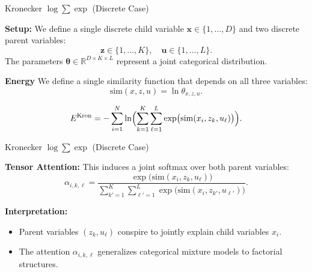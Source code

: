 \documentclass{beamer}
\begin{document}

\begin{frame}{Kronecker $\log \sum \exp$ (Discrete Case)}

    \textbf{Setup:}  
    We define a single discrete child variable \(\bm{x} \in \{1, \dots, D\}\) and two discrete parent variables:
    \[
    \bm{z} \in \{1, \dots, K\}, 
    \quad 
    \bm{u} \in \{1, \dots, L\}.
    \]
    The parameters \(\bm{\theta} \in \mathbb{R}^{D \times K \times L}\) represent a joint categorical distribution.
        
    \textbf{Energy}  
    We define a single similarity function that depends on all three variables:
    \[
    \mathrm{sim}(x, z, u)
    =
    \ln \theta_{x, z, u}.
    \]
    
    \[
        E^{\mathrm{Kron}}
        =
        - \sum_{i=1}^{N}
        \ln \Bigl(
        \sum_{k=1}^{K} \sum_{\ell=1}^{L}
        \exp\bigl(\mathrm{sim}(x_i, z_k, u_\ell)\bigr)
        \Bigr).
        \]
    \end{frame}
    
    
\begin{frame}{Kronecker $\log \sum \exp$ (Discrete Case)}


    \textbf{Tensor Attention:}  
    This induces a joint softmax over both parent variables:
    \[
    \alpha_{i,k,\ell} =
    \frac{\exp\bigl(\mathrm{sim}(x_i, z_k, u_\ell)\bigr)}
         {\sum_{k'=1}^{K} \sum_{\ell'=1}^{L} \exp\bigl(\mathrm{sim}(x_i, z_{k'}, u_{\ell'})\bigr)}.
    \]

    \bigskip
    
    \textbf{Interpretation:}  
    \begin{itemize}
        \item Parent variables \((z_k, u_\ell)\) conspire to jointly explain child variables \(x_i\).
        \item The attention \(\alpha_{i,k,\ell}\) generalizes categorical mixture models to factorial structures.
    \end{itemize}
    
    \end{frame}
    
\end{document}
